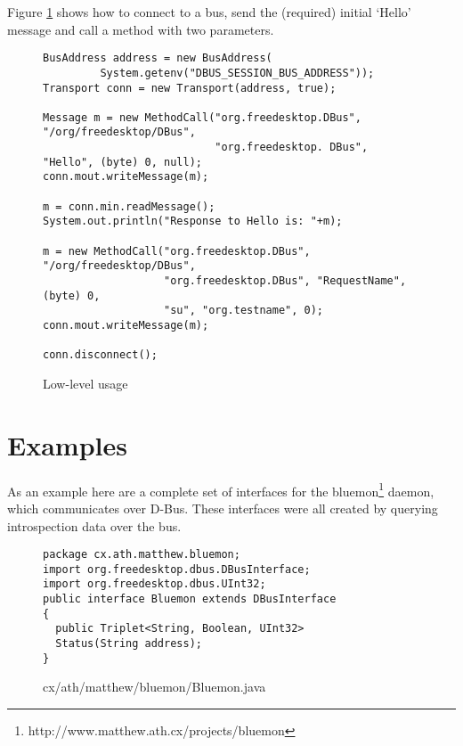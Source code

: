 \documentclass[a4paper,12pt]{article}
\begin{document}
Figure \ref{fig:lowlevel} shows how to connect to a bus, send the (required)
initial `Hello' message and 
call a method with two parameters.

\begin{figure}[htb]
\begin{center}
\begin{verbatim}
BusAddress address = new BusAddress(
         System.getenv("DBUS_SESSION_BUS_ADDRESS"));
Transport conn = new Transport(address, true);

Message m = new MethodCall("org.freedesktop.DBus", "/org/freedesktop/DBus", 
                           "org.freedesktop. DBus", "Hello", (byte) 0, null);
conn.mout.writeMessage(m);

m = conn.min.readMessage();
System.out.println("Response to Hello is: "+m);

m = new MethodCall("org.freedesktop.DBus", "/org/freedesktop/DBus", 
                   "org.freedesktop.DBus", "RequestName", (byte) 0, 
                   "su", "org.testname", 0);
conn.mout.writeMessage(m);

conn.disconnect();
\end{verbatim}
\end{center}
\caption{Low-level usage}
\label{fig:lowlevel}
\end{figure}

\section{Examples}

As an example here are a complete set of interfaces for the
bluemon\footnote{http://www.matthew.ath.cx/projects/bluemon} daemon,
which communicates over D-Bus. These interfaces were all created by
querying introspection data over the bus.

\newpage

\begin{figure}[!h]
\begin{center}
\begin{verbatim}
package cx.ath.matthew.bluemon;
import org.freedesktop.dbus.DBusInterface;
import org.freedesktop.dbus.UInt32;
public interface Bluemon extends DBusInterface
{
  public Triplet<String, Boolean, UInt32> 
  Status(String address);
}
\end{verbatim}
\end{center}
\caption{cx/ath/matthew/bluemon/Bluemon.java}
\end{figure}

\newpage
\end{document}
